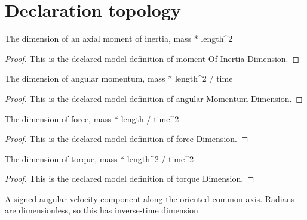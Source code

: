 \section{Declaration topology}
\begin{definition}
  \label{def:physics:phyx-mini-0826:phyxminiproblems-problemphyxmini0826-momentofinertiadimension}
  The dimension of an axial moment of inertia, mass * length\textasciicircum{}2
\end{definition}
\begin{proof}
  This is the declared model definition of moment Of Inertia Dimension.
\end{proof}
\begin{definition}
  \label{def:physics:phyx-mini-0826:phyxminiproblems-problemphyxmini0826-angularmomentumdimension}
  The dimension of angular momentum, mass * length\textasciicircum{}2 / time
\end{definition}
\begin{proof}
  This is the declared model definition of angular Momentum Dimension.
\end{proof}
\begin{definition}
  \label{def:physics:phyx-mini-0826:phyxminiproblems-problemphyxmini0826-forcedimension}
  The dimension of force, mass * length / time\textasciicircum{}2
\end{definition}
\begin{proof}
  This is the declared model definition of force Dimension.
\end{proof}
\begin{definition}
  \label{def:physics:phyx-mini-0826:phyxminiproblems-problemphyxmini0826-torquedimension}
  The dimension of torque, mass * length\textasciicircum{}2 / time\textasciicircum{}2
\end{definition}
\begin{proof}
  This is the declared model definition of torque Dimension.
\end{proof}
\begin{definition}
  \label{def:physics:phyx-mini-0826:phyxminiproblems-problemphyxmini0826-axialangularvelocity}
  A signed angular velocity component along the oriented common axis. Radians are dimensionless, so this has inverse-time dimension
\end{definition}
